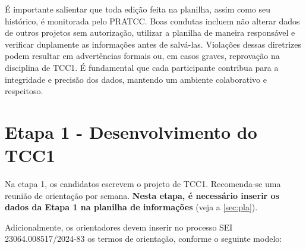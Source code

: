 \documentclass[a4paper, 12pt]{article}
\newcommand{\seiprocess}{23064.008517/2024-83} %
\begin{document}
	É importante salientar que toda edição feita na planilha, assim como seu histórico, é monitorada pelo PRATCC. Boas condutas incluem não alterar dados de outros projetos sem autorização, utilizar a planilha de maneira responsável e verificar duplamente as informações antes de salvá-las. Violações dessas diretrizes podem resultar em advertências formais ou, em casos graves, reprovação na disciplina de TCC1. É fundamental que cada participante contribua para a integridade e precisão dos dados, mantendo um ambiente colaborativo e respeitoso.

	\section{Etapa 1 - Desenvolvimento do TCC1}
	\label{sec:et1}
	Na etapa 1, os candidatos escrevem o projeto de TCC1. Recomenda-se uma reunião de orientação por semana. \textbf{Nesta etapa, é necessário inserir os dados da Etapa 1 na planilha de informações} (veja a \autoref{sec:pla}).
	
	Adicionalmente, os orientadores devem inserir no processo SEI \seiprocess{} os termos de orientação, conforme o seguinte modelo:
\end{document}
